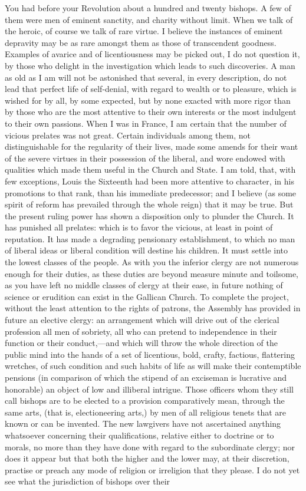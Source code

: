 You had before your Revolution about a hundred and twenty bishops. A few of them were men of eminent sanctity, and charity without limit. When we talk of the heroic, of course we talk of rare virtue. I believe the instances of eminent depravity may be as rare amongst them as those of transcendent goodness. Examples of avarice and of licentiousness may be picked out, I do not question it, by those who delight in the investigation which leads to such discoveries. A man as old as I am will not be astonished that several, in every description, do not lead that perfect life of self-denial, with regard to wealth or to pleasure, which is wished for by all, by some expected, but by none exacted with more rigor than by those who are the most attentive to their own interests or the most indulgent to their own passions. When I was in France, I am certain that the number of vicious prelates was not great. Certain individuals among them, not distinguishable for the regularity of their lives, made some amends for their want of the severe virtues in their possession of the liberal, and wore endowed with qualities which made them useful in the Church and State. I am told, that, with few exceptions, Louis the Sixteenth had been more attentive to character, in his promotions to that rank, than his immediate predecessor; and I believe (as some spirit of reform has prevailed through the whole reign) that it may be true. But the present ruling power has shown a disposition only to plunder the Church. It has punished all prelates: which is to favor the vicious, at least in point of reputation. It has made a degrading pensionary establishment, to which no man of liberal ideas or liberal condition will destine his children. It must settle into the lowest classes of the people. As with you the inferior clergy are not numerous enough for their duties, as these duties are beyond measure minute and toilsome, as you have left no middle classes of clergy at their ease, in future nothing of science or erudition can exist in the Gallican Church. To complete the project, without the least attention to the rights of patrons, the Assembly has provided in future an elective clergy: an arrangement which will drive out of the clerical profession all men of sobriety, all who can pretend to independence in their function or their conduct,—and which will throw the whole direction of the public mind into the hands of a set of licentious, bold, crafty, factious, flattering wretches, of such condition and such habits of life as will make their contemptible pensions (in comparison of which the stipend of an exciseman is lucrative and honorable) an object of low and illiberal intrigue. Those officers whom they still call bishops are to be elected to a provision comparatively mean, through the same arts, (that is, electioneering arts,) by men of all religious tenets that are known or can be invented. The new lawgivers have not ascertained anything whatsoever concerning their qualifications, relative either to doctrine or to morals, no more than they have done with regard to the subordinate clergy; nor does it appear but that both the higher and the lower may, at their discretion, practise or preach any mode of religion or irreligion that they please. I do not yet see what the jurisdiction of bishops over their 